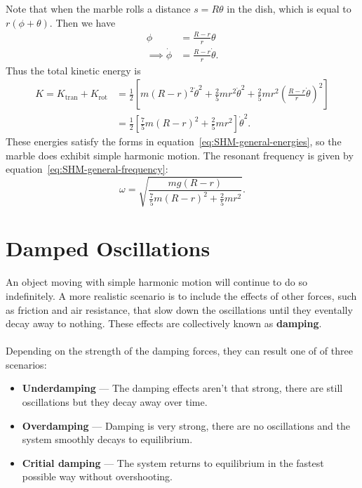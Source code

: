 \documentclass[../classical_mechanics.tex]{subfiles}
\begin{document}
\begin{example}
            Note that when the marble rolls a distance $s=R\theta$ in the dish, which is equal to $r(\phi+\theta)$.
            Then we have
            \begin{align}
                \phi&=\frac{R-r}{r}\theta\\
                \implies\dot{\phi}&=\frac{R-r}{r}\dot{\theta}.
            \end{align}
            Thus the total kinetic energy is
            \begin{align}
                K=K_\text{tran}+K_\text{rot}&=\frac{1}{2}\left[m(R-r)^2\dot{\theta}^2+\frac{2}{5}mr^2\dot{\theta}^2+\frac{2}{5}mr^2\left(\frac{R-r}{r}\dot{\theta}\right)^2\right]\\
                &=\frac{1}{2}\left[\frac{7}{5}m(R-r)^2+\frac{2}{5}mr^2\right]\dot{\theta}^2.
            \end{align}
            These energies satisfy the forms in equation~\ref{eq:SHM-general-energies}, so the marble does exhibit simple harmonic motion.
            The resonant frequency is given by equation~\ref{eq:SHM-general-frequency}:
            \begin{equation}
                \omega=\sqrt{\frac{mg(R-r)}{\frac{7}{5}m(R-r)^2+\frac{2}{5}mr^2}}.
            \end{equation}
        \end{example}

    \section{Damped Oscillations}
        \paragraph{}
        An object moving with simple harmonic motion will continue to do so indefinitely.
        A more realistic scenario is to include the effects of other forces, such as friction and air resistance, that slow down the oscillations until they eventally decay away to nothing.
        These effects are collectively known as \textbf{damping}.
    
        \paragraph{}
        Depending on the strength of the damping forces, they can result one of of three scenarios:
        \begin{itemize}
            \item \textbf{Underdamping} --- The damping effects aren't that strong, there are still oscillations but they decay away over time.
            \item \textbf{Overdamping} --- Damping is very strong, there are no oscillations and the system smoothly decays to equilibrium.
            \item \textbf{Critial damping} --- The system returns to equilibrium in the fastest possible way without overshooting.
        \end{itemize}
\end{document}

